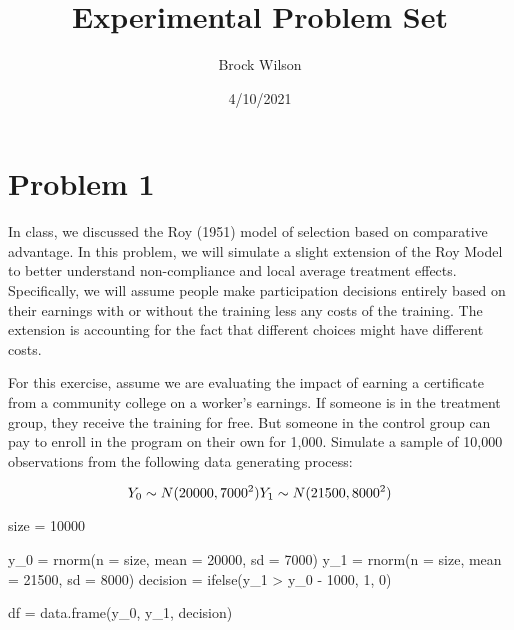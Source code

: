 \documentclass[
]{article}
\title{Experimental Problem Set}
\author{Brock Wilson}
\date{4/10/2021}
\newenvironment{Shaded}{\begin{snugshade}}{\end{snugshade}}
\newcommand{\AttributeTok}[1]{\textcolor[rgb]{0.77,0.63,0.00}{#1}}
\newcommand{\DecValTok}[1]{\textcolor[rgb]{0.00,0.00,0.81}{#1}}
\newcommand{\FunctionTok}[1]{\textcolor[rgb]{0.00,0.00,0.00}{#1}}
\newcommand{\NormalTok}[1]{#1}
\newcommand{\OtherTok}[1]{\textcolor[rgb]{0.56,0.35,0.01}{#1}}
\newcommand{\SpecialCharTok}[1]{\textcolor[rgb]{0.00,0.00,0.00}{#1}}
\begin{document}
\maketitle

\hypertarget{problem-1}{%
\section{Problem 1}\label{problem-1}}

In class, we discussed the Roy (1951) model of selection based on
comparative advantage. In this problem, we will simulate a slight
extension of the Roy Model to better understand non-compliance and local
average treatment effects. Specifically, we will assume people make
participation decisions entirely based on their earnings with or without
the training less any costs of the training. The extension is accounting
for the fact that different choices might have different costs.

For this exercise, assume we are evaluating the impact of earning a
certificate from a community college on a worker's earnings. If someone
is in the treatment group, they receive the training for free. But
someone in the control group can pay to enroll in the program on their
own for 1,000. Simulate a sample of 10,000 observations from the
following data generating process:

\[
Y_0 \sim N(20000, 7000^2) \\
Y_1 \sim N(21500, 8000^2)
\]

\begin{Shaded}
\begin{Highlighting}[]
\NormalTok{size }\OtherTok{=} \DecValTok{10000}

\NormalTok{y\_0 }\OtherTok{=} \FunctionTok{rnorm}\NormalTok{(}\AttributeTok{n =}\NormalTok{ size, }\AttributeTok{mean =} \DecValTok{20000}\NormalTok{, }\AttributeTok{sd =} \DecValTok{7000}\NormalTok{)}
\NormalTok{y\_1 }\OtherTok{=} \FunctionTok{rnorm}\NormalTok{(}\AttributeTok{n =}\NormalTok{ size, }\AttributeTok{mean =} \DecValTok{21500}\NormalTok{, }\AttributeTok{sd =} \DecValTok{8000}\NormalTok{)}
\NormalTok{decision }\OtherTok{=} \FunctionTok{ifelse}\NormalTok{(y\_1 }\SpecialCharTok{\textgreater{}}\NormalTok{ y\_0 }\SpecialCharTok{{-}} \DecValTok{1000}\NormalTok{, }\DecValTok{1}\NormalTok{, }\DecValTok{0}\NormalTok{)}

\NormalTok{df }\OtherTok{=} \FunctionTok{data.frame}\NormalTok{(y\_0, y\_1, decision)}
\end{Highlighting}
\end{Shaded}
\end{document}
